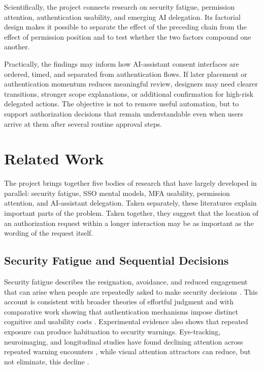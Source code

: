 \documentclass[11pt]{article}
\begin{document}
Scientifically, the project connects research on security fatigue, permission
attention, authentication usability, and emerging AI delegation. Its factorial
design makes it possible to separate the effect of the preceding chain from the
effect of permission position and to test whether the two factors compound one
another.

Practically, the findings may inform how AI-assistant consent interfaces are
ordered, timed, and separated from authentication flows. If later placement or
authentication momentum reduces meaningful review, designers may need clearer
transitions, stronger scope explanations, or additional confirmation for
high-risk delegated actions. The objective is not to remove useful automation,
but to support authorization decisions that remain understandable even when
users arrive at them after several routine approval steps.

\section{Related Work}
\label{sec:related}

The project brings together five bodies of research that have largely
developed in parallel: security fatigue, SSO mental models, MFA usability,
permission attention, and AI-assistant delegation. Taken separately, these
literatures explain important parts of the problem. Taken together, they
suggest that the location of an authorization request within a longer
interaction may be as important as the wording of the request itself.

\subsection{Security Fatigue and Sequential Decisions}
\label{sec:rw-fatigue}

Security fatigue describes the resignation, avoidance, and reduced engagement
that can arise when people are repeatedly asked to make security decisions
\cite{stanton2016fatigue}. This account is consistent with broader theories of
effortful judgment \cite{kahneman2011thinking} and with comparative work
showing that authentication mechanisms impose distinct cognitive and usability
costs \cite{bonneau2012quest}. Experimental evidence also shows that repeated
exposure can produce habituation to security warnings. Eye-tracking,
neuroimaging, and longitudinal studies have found declining attention across
repeated warning encounters \cite{anderson2016memory,vance2018tuning}, while
visual attention attractors can reduce, but not eliminate, this decline
\cite{bravolillo2014harder}.
\end{document}
